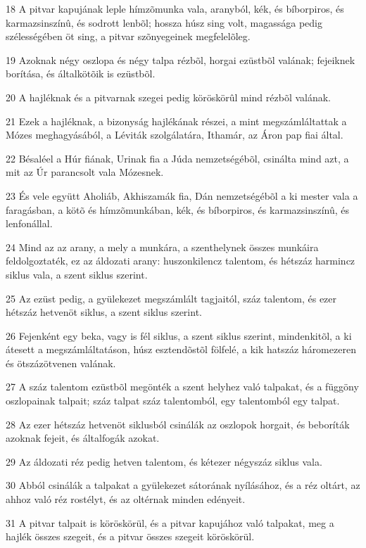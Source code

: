 \par 18 A pitvar kapujának leple hímzõmunka vala, aranyból, kék, és bíborpiros, és karmazsinszínû, és sodrott lenbõl; hossza húsz sing volt, magassága pedig szélességében öt sing, a pitvar szõnyegeinek megfelelõleg.
\par 19 Azoknak négy oszlopa és négy talpa rézbõl, horgai ezüstbõl valának; fejeiknek borítása, és általkötõik is ezüstbõl.
\par 20 A hajléknak és a pitvarnak szegei pedig köröskörûl mind rézbõl valának.
\par 21 Ezek a hajléknak, a bizonyság hajlékának részei, a mint megszámláltattak a Mózes meghagyásából, a Léviták szolgálatára, Ithamár, az Áron pap fiai által.
\par 22 Bésaléel a Húr fiának, Urinak fia a Júda nemzetségébõl, csinálta mind azt, a mit az Úr parancsolt vala Mózesnek.
\par 23 És vele együtt Aholiáb, Akhiszamák fia, Dán nemzetségébõl a ki mester vala a faragásban, a kötõ és hímzõmunkában, kék, és bíborpiros, és karmazsinszínû, és lenfonállal.
\par 24 Mind az az arany, a mely a munkára, a szenthelynek összes munkáira feldolgoztaték, ez az áldozati arany: huszonkilencz talentom, és hétszáz harmincz siklus vala, a szent siklus szerint.
\par 25 Az ezüst pedig, a gyülekezet megszámlált tagjaitól, száz talentom, és ezer hétszáz hetvenöt siklus, a szent siklus szerint.
\par 26 Fejenként egy beka, vagy is fél siklus, a szent siklus szerint, mindenkitõl, a ki átesett a megszámláltatáson, húsz esztendõstõl fölfelé, a kik hatszáz háromezeren és ötszázötvenen valának.
\par 27 A száz talentom ezüstbõl megönték a szent helyhez való talpakat, és a függöny oszlopainak talpait; száz talpat száz talentomból, egy talentomból egy talpat.
\par 28 Az ezer hétszáz hetvenöt siklusból csinálák az oszlopok horgait, és beboríták azoknak fejeit, és általfogák azokat.
\par 29 Az áldozati réz pedig hetven talentom, és kétezer négyszáz siklus vala.
\par 30 Abból csinálák a talpakat a gyülekezet sátorának nyílásához, és a réz oltárt, az ahhoz való réz rostélyt, és az oltérnak minden edényeit.
\par 31 A pitvar talpait is köröskörül, és a pitvar kapujához való talpakat, meg a hajlék összes szegeit, és a pitvar összes szegeit köröskörül.


